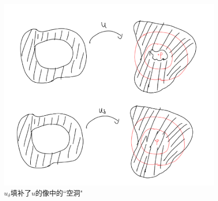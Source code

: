 \begin{figure}[h]
    \centering
    \includegraphics[scale=0.5]{images/contraction.png}
    \caption{$u_\delta$填补了$u$的像中的``空洞"}
    \label{aaaanonlabel}
\end{figure}


